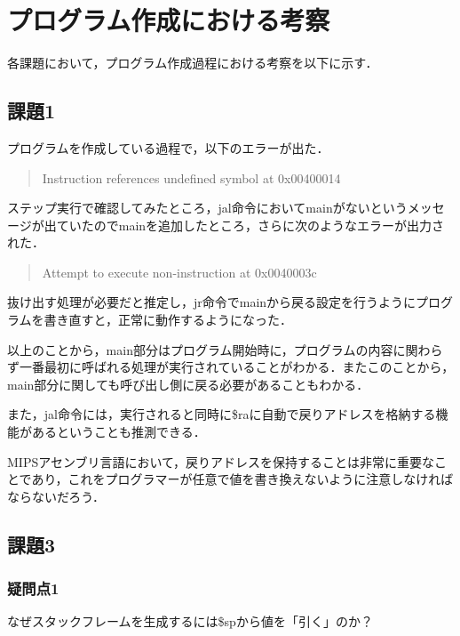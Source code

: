 \documentclass[a4j]{jarticle}
\begin{document}
%
%

\section{プログラム作成における考察}

各課題において，プログラム作成過程における考察を以下に示す．

\subsection{課題1}

プログラムを作成している過程で，以下のエラーが出た．

\begin{quote}
Instruction references undefined symbol at 0x00400014
\end{quote}

ステップ実行で確認してみたところ，jal命令においてmainがないというメッセージが出ていたのでmainを追加したところ，さらに次のようなエラーが出力された．

\begin{quote}
Attempt to execute non-instruction at 0x0040003c
\end{quote}

抜け出す処理が必要だと推定し，jr命令でmainから戻る設定を行うようにプログラムを書き直すと，正常に動作するようになった．

以上のことから，main部分はプログラム開始時に，プログラムの内容に関わらず一番最初に呼ばれる処理が実行されていることがわかる．またこのことから，main部分に関しても呼び出し側に戻る必要があることもわかる．

また，jal命令には，実行されると同時に\$raに自動で戻りアドレスを格納する機能があるということも推測できる．

MIPSアセンブリ言語において，戻りアドレスを保持することは非常に重要なことであり，これをプログラマーが任意で値を書き換えないように注意しなければならないだろう．




\subsection{課題3}

\subsubsection{疑問点1}

なぜスタックフレームを生成するには\$spから値を「引く」のか？
\end{document}

